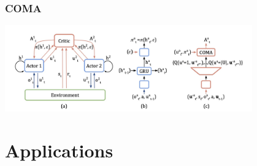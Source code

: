 \documentclass[notheorems, aspectratio=54]{beamer}
\begin{document}
\begin{frame}
  \frametitle{COMA}
  \begin{center}
    \includegraphics[width=0.8\textwidth]{coma.png}
  \end{center}
\end{frame}

\section{Applications}
\end{document}
